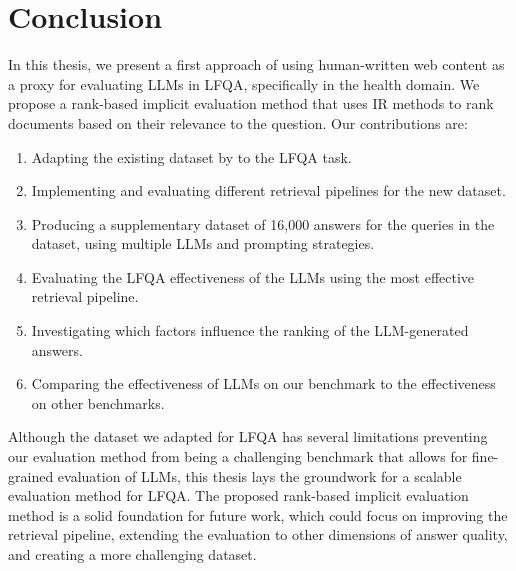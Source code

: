 \section{Conclusion}
In this thesis, we present a first approach of using human-written web content as a proxy for evaluating LLMs in LFQA, specifically in the health domain.
We propose a rank-based implicit evaluation method that uses IR methods to rank documents based on their relevance to the question.
Our contributions are:
\begin{enumerate}
    \item Adapting the existing dataset by \cite{goeuriot:2021:Consumer} to the LFQA task.
    \item Implementing and evaluating different retrieval pipelines for the new dataset.
    \item Producing a supplementary dataset of 16,000 answers for the queries in the dataset, using multiple LLMs and prompting strategies.
    \item Evaluating the LFQA effectiveness of the LLMs using the most effective retrieval pipeline.
    \item Investigating which factors influence the ranking of the LLM-generated answers.
    \item Comparing the effectiveness of LLMs on our benchmark to the effectiveness on other benchmarks.
\end{enumerate}

Although the dataset we adapted for LFQA has several limitations preventing our evaluation method from being a challenging benchmark that allows for fine-grained evaluation of LLMs, this thesis lays the groundwork for a scalable evaluation method for LFQA.
The proposed rank-based implicit evaluation method is a solid foundation for future work, which could focus on improving the retrieval pipeline, extending the evaluation to other dimensions of answer quality, and creating a more challenging dataset.